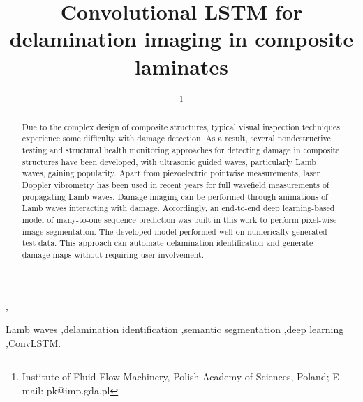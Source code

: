 \documentclass{IOS-Book-Article}
\def\hb{\hbox to 10.7 cm{}}
\begin{document}
\pagestyle{headings}
\def\thepage{}

\begin{frontmatter}              %


\title{Convolutional LSTM for delamination imaging in composite laminates}

\markboth{}{July 2022\hb}

\author[A]{
\thanks{Institute of Fluid Flow Machinery, Polish Academy of Sciences, Poland; E-mail: pk@imp.gda.pl}
},
\author[A]{ }

\address[A]{Institute of Fluid Flow Machinery, Polish Academy of Sciences, Poland}


\begin{abstract}
	Due to the complex design of composite structures, typical visual inspection techniques experience some difficulty with damage detection.
	As a result, several nondestructive testing and structural health monitoring approaches for detecting damage in composite structures have been developed, with ultrasonic guided waves, particularly Lamb waves, gaining popularity.
	Apart from piezoelectric pointwise measurements, laser Doppler vibrometry has been used in recent years for full wavefield measurements of propagating Lamb waves.
	Damage imaging can be performed through animations of Lamb waves interacting with damage.
	Accordingly, an end-to-end deep learning-based model of many-to-one sequence prediction was built in this work to perform pixel-wise image segmentation.
	The developed model performed well on numerically generated test data.
	This approach can automate delamination identification and generate damage maps without requiring user involvement.
\end{abstract}

\begin{keyword}
	Lamb waves \sep delamination identification \sep semantic 
	segmentation \sep deep learning \sep ConvLSTM.
\end{keyword}
\end{frontmatter}
\markboth{July 2022\hb}{July 2022\hb}
\end{document}
